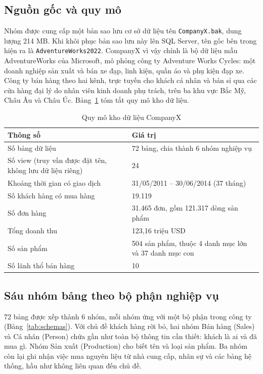 
\subsection{Nguồn gốc và quy mô}
Nhóm được cung cấp một bản sao lưu cơ sở dữ liệu tên \texttt{CompanyX.bak}, dung lượng 214 MB. Khi khôi phục bản sao lưu này lên SQL Server, tên gốc bên trong hiện ra là \texttt{AdventureWorks2022}. CompanyX vì vậy chính là bộ dữ liệu mẫu AdventureWorks của Microsoft, mô phỏng công ty Adventure Works Cycles: một doanh nghiệp sản xuất và bán xe đạp, linh kiện, quần áo và phụ kiện đạp xe. Công ty bán hàng theo hai kênh, trực tuyến cho khách cá nhân và bán sỉ qua các cửa hàng đại lý do nhân viên kinh doanh phụ trách, trên ba khu vực Bắc Mỹ, Châu Âu và Châu Úc. Bảng~\ref{tab:overview} tóm tắt quy mô kho dữ liệu.

\begin{table}[H]
\centering
\caption{Quy mô kho dữ liệu CompanyX}
\label{tab:overview}
\begin{tabularx}{\textwidth}{>{\raggedright\arraybackslash}p{5.5cm} X}
\toprule
\rowcolor{tblhead} \textbf{Thông số} & \textbf{Giá trị} \\
\midrule
Số bảng dữ liệu & 72 bảng, chia thành 6 nhóm nghiệp vụ \\
Số view (truy vấn được đặt tên, không lưu dữ liệu riêng) & 24 \\
Khoảng thời gian có giao dịch & 31/05/2011 -- 30/06/2014 (37 tháng) \\
Số khách hàng có mua hàng & 19.119 \\
Số đơn hàng & 31.465 đơn, gồm 121.317 dòng sản phẩm \\
Tổng doanh thu & 123,16 triệu USD \\
Số sản phẩm & 504 sản phẩm, thuộc 4 danh mục lớn và 37 danh mục con \\
Số lãnh thổ bán hàng & 10 \\
\bottomrule
\end{tabularx}
\end{table}

\subsection{Sáu nhóm bảng theo bộ phận nghiệp vụ}
72 bảng được xếp thành 6 nhóm, mỗi nhóm ứng với một bộ phận trong công ty (Bảng~\ref{tab:schemas}). Với chủ đề khách hàng rời bỏ, hai nhóm Bán hàng (Sales) và Cá nhân (Person) chứa gần như toàn bộ thông tin cần thiết: khách là ai và đã mua gì. Nhóm Sản xuất (Production) cho biết tên và loại sản phẩm. Ba nhóm còn lại ghi nhận việc mua nguyên liệu từ nhà cung cấp, nhân sự và các bảng hệ thống, hầu như không liên quan đến chủ đề.

